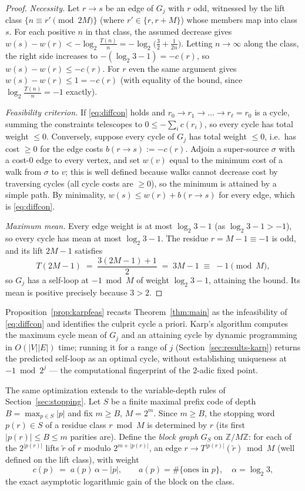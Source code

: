 \documentclass[11pt]{amsart}
\theoremstyle{definition}
\theoremstyle{remark}
\newcommand{\Z}{\mathbb{Z}}
\begin{document}
\begin{proof}
\emph{Necessity.} Let $r \to s$ be an edge of $G_j$ with $r$ odd, witnessed by the lift class $\{n \equiv r' \pmod {2M}\}$ (where $r' \in \{r, r+M\}$) whose members map into class $s$. For each positive $n$ in that class, the assumed decrease gives $w(s) - w(r) < -\log_2 \frac{T(n)}{n} = -\log_2\bigl(\frac32 + \frac1{2n}\bigr)$. Letting $n \to \infty$ along the class, the right side increases to $-(\log_2 3 - 1) = -c(r)$, so $w(s) - w(r) \le -c(r)$. For $r$ even the same argument gives $w(s) - w(r) \le 1 = -c(r)$ (with equality of the bound, since $\log_2\frac{T(n)}{n} = -1$ exactly).

\emph{Feasibility criterion.} If \eqref{eq:diffcon} holds and $r_0 \to r_1 \to \dots \to r_\ell = r_0$ is a cycle, summing the constraints telescopes to $0 \le -\sum_i c(r_i)$, so every cycle has total weight $\le 0$. Conversely, suppose every cycle of $G_j$ has total weight $\le 0$, i.e.\ has cost $\ge 0$ for the edge costs $b(r \to s) := -c(r)$. Adjoin a super-source $\sigma$ with a cost-$0$ edge to every vertex, and set $w(v)$ equal to the minimum cost of a walk from $\sigma$ to $v$; this is well defined because walks cannot decrease cost by traversing cycles (all cycle costs are $\ge 0$), so the minimum is attained by a simple path. By minimality, $w(s) \le w(r) + b(r \to s)$ for every edge, which is \eqref{eq:diffcon}.

\emph{Maximum mean.} Every edge weight is at most $\log_2 3 - 1$ (as $\log_2 3 - 1 > -1$), so every cycle has mean at most $\log_2 3 - 1$. The residue $r = M - 1 \equiv -1$ is odd, and its lift $2M - 1$ satisfies
\[
T(2M-1) \;=\; \frac{3(2M-1)+1}{2} \;=\; 3M - 1 \;\equiv\; -1 \pmod{M},
\]
so $G_j$ has a self-loop at $-1 \bmod M$ of weight $\log_2 3 - 1$, attaining the bound. Its mean is positive precisely because $3 > 2$.
\end{proof}

Proposition~\ref{prop:karpfeas} recasts Theorem~\ref{thm:main} as the infeasibility of \eqref{eq:diffcon} and identifies the culprit cycle a priori. Karp's algorithm \cite{karp1978} computes the maximum cycle mean of $G_j$ and an attaining cycle by dynamic programming in $O(|V||E|)$ time; running it for a range of $j$ (Section~\ref{sec:results-karp}) returns the predicted self-loop as an optimal cycle, without establishing uniqueness at $-1 \bmod 2^j$ --- the computational fingerprint of the $2$-adic fixed point.

The same optimization extends to the variable-depth rules of Section~\ref{sec:stopping}. Let $S$ be a finite maximal prefix code of depth $B = \max_{p \in S}|p|$ and fix $m \ge B$, $M = 2^m$. Since $m \ge B$, the stopping word $p(r) \in S$ of a residue class $r \bmod M$ is determined by $r$ (its first $|p(r)| \le B \le m$ parities are). Define the \emph{block graph} $G_S$ on $\Z/M\Z$: for each of the $2^{|p(r)|}$ lifts $\tilde r$ of $r$ modulo $2^{m + |p(r)|}$, an edge $r \to T^{|p(r)|}(\tilde r) \bmod M$ (well defined on the lift class), with weight
\[
c(p) \;=\; a(p)\,\alpha - |p| , \qquad a(p) = \#\{\text{ones in } p\},\quad \alpha = \log_2 3,
\]
the exact asymptotic logarithmic gain of the block on the class.
\end{document}
